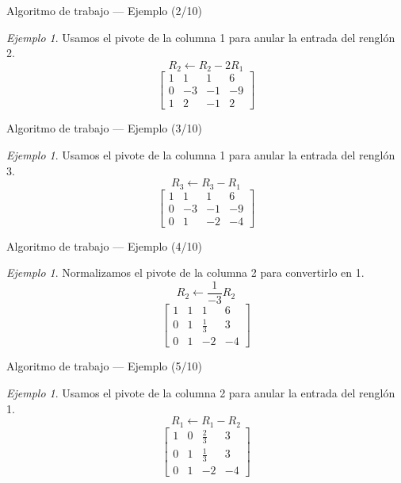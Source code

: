 \documentclass[aspectratio=169,11pt]{beamer}
\theoremstyle{remark}
\newtheorem{Ejem}[definicion]{Ejemplo}
\begin{document}
\begin{frame}{Algoritmo de trabajo — Ejemplo (2/10)}
\begin{Ejem}
Usamos el pivote de la columna 1 para anular la entrada del renglón 2.
\[
R_{2}\leftarrow R_{2}-2R_{1}
\]
\[
\left[\begin{array}{ccc|c}
1 & 1 & 1 & 6\\
0 & -3 & -1 & -9\\
1 & 2 & -1 & 2
\end{array}\right]
\]
\end{Ejem}
\end{frame}

\begin{frame}{Algoritmo de trabajo — Ejemplo (3/10)}
\begin{Ejem}
Usamos el pivote de la columna 1 para anular la entrada del renglón 3.
\[
R_{3}\leftarrow R_{3}-R_{1}
\]
\[
\left[\begin{array}{ccc|c}
1 & 1 & 1 & 6\\
0 & -3 & -1 & -9\\
0 & 1 & -2 & -4
\end{array}\right]
\]
\end{Ejem}
\end{frame}

\begin{frame}{Algoritmo de trabajo — Ejemplo (4/10)}
\begin{Ejem}
Normalizamos el pivote de la columna 2 para convertirlo en 1.
\[
R_{2}\leftarrow \frac{1}{-3}R_{2}
\]
\[
\left[\begin{array}{ccc|c}
1 & 1 & 1 & 6\\
0 & 1 & \frac{1}{3} & 3\\
0 & 1 & -2 & -4
\end{array}\right]
\]
\end{Ejem}
\end{frame}

\begin{frame}{Algoritmo de trabajo — Ejemplo (5/10)}
\begin{Ejem}
Usamos el pivote de la columna 2 para anular la entrada del renglón 1.
\[
R_{1}\leftarrow R_{1}-R_{2}
\]
\[
\left[\begin{array}{ccc|c}
1 & 0 & \frac{2}{3} & 3\\
0 & 1 & \frac{1}{3} & 3\\
0 & 1 & -2 & -4
\end{array}\right]
\]
\end{Ejem}
\end{frame}
\end{document}
